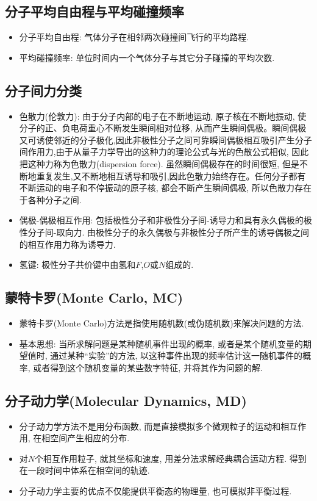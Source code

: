 \documentclass[a4paper,titlepage,twocolumn]{article}
\begin{document}
\subsection{分子平均自由程与平均碰撞频率}
\begin{itemize}
\item 分子平均自由程: 气体分子在相邻两次碰撞间飞行的平均路程.
\item 平均碰撞频率: 单位时间内一个气体分子与其它分子碰撞的平均次数.
\end{itemize}


\subsection{分子间力分类}
\begin{itemize}
\item 色散力(伦敦力): 由于分子内部的电子在不断地运动, 原子核在不断地振动, 使分子的正、负电荷重心不断发生瞬间相对位移, 从而产生瞬间偶极。瞬间偶极又可诱使邻近的分子极化,因此非极性分子之间可靠瞬间偶极相互吸引产生分子间作用力,由于从量子力学导出的这种力的理论公式与光的色散公式相似, 因此把这种力称为色散力(dispersion force). 虽然瞬间偶极存在的时间很短, 但是不断地重复发生,又不断地相互诱导和吸引,因此色散力始终存在。任何分子都有不断运动的电子和不停振动的原子核, 都会不断产生瞬间偶极, 所以色散力存在于各种分子之间.

\item 偶极-偶极相互作用: 包括极性分子和非极性分子间-诱导力和具有永久偶极的极性分子间-取向力.
由极性分子的永久偶极与非极性分子所产生的诱导偶极之间的相互作用力称为诱导力.

\item 氢键: 极性分子共价键中由氢和$F$,$O$或$N$组成的.
\end{itemize}

\subsection{蒙特卡罗(Monte Carlo, MC)}
\begin{itemize}
\item 蒙特卡罗(Monte Carlo)方法是指使用随机数(或伪随机数)来解决问题的方法.
\item 基本思想: 当所求解问题是某种随机事件出现的概率, 或者是某个随机变量的期望值时, 通过某种``实验''的方法, 以这种事件出现的频率估计这一随机事件的概率, 或者得到这个随机变量的某些数字特征, 并将其作为问题的解.
\end{itemize}

\subsection{分子动力学(Molecular Dynamics, MD)}
\begin{itemize}
\item 分子动力学方法不是用分布函数, 而是直接模拟多个微观粒子的运动和相互作用, 在相空间产生相应的分布.
\item 对$N$个相互作用粒子, 就其坐标和速度, 用差分法求解经典耦合运动方程. 得到在一段时间中体系在相空间的轨迹.
\item 分子动力学主要的优点不仅能提供平衡态的物理量, 也可模拟非平衡过程.
\end{itemize}
\end{document}
